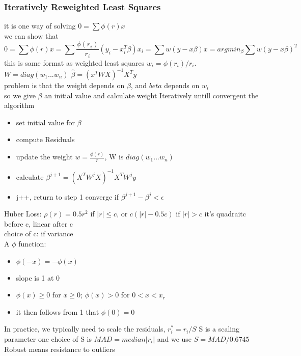 \documentclass[10pt]{article}
\theoremstyle{break}
\begin{document}
        \subsubsection{Iteratively Reweighted Least Squares}
            it is one way of solving $0=\sum \phi(r)x$
            \\we can show that$$0=\sum \phi(r)x=\sum\frac{\phi(r_i)}{r_i}(y_i-x_i^T\beta)x_i=
            \sum w(y-x\beta)x=argmin_\beta \sum w(y-x\beta)^2$$ 
            this is same format as weighted least squares
            $w_i=\phi(r_i)/r_i$. $W=diag(w_1...w_n)$ $\hat{\beta}=(x^TWX)^{-1}X^Ty$
            \\problem is that the weight depends on $\beta$, and $beta$ depends on $w_i$
            \\so we give $\beta$ an initial value and calculate weight Iteratively untill convergent
            {\Large the algorithm}
            \begin{itemize}
                \item set initial value for $\beta$
                \item compute Residuals
                \item update the weight $w=\frac{\phi(r)}{r}$, W is $diag(w_1...w_n)$
                \item calculate $\beta^{j+1}=(X^TW^jX)^{-1}X^TW^jy$
                \item j++, return to step 1 converge if $\beta^{j+1}-\beta^j < \epsilon$
            \end{itemize}
            Huber Loss:
            $\rho(r)=0.5r^2$ if $|r| \leq c$, or $c(|r|-0.5c)$ if $|r|>c$ it's quadraitc before c, linear after c
            \\choice of c: if variance 
            \\A $\phi$ function:
            \begin{itemize}
                \item $\phi(-x)=-\phi(x)$
                \item slope is 1 at 0
                \item $\phi(x)\geq 0$ for $x\geq 0$; $\phi(x)>0$ for $0<x<x_r$
                \item it then follows from 1 that $\phi(0)=0$
            \end{itemize}
            In practice, we typically need to scale the residuals, $r_i^*=r_i/S$ S is a scaling parameter
            one choice of S is $MAD=median|r_i|$ and we use $S=MAD/{0.6745}$
        Robust means resistance to outliers 
\end{document}
